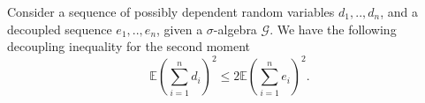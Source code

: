 \documentclass[ECP]{ejpecp} %
\newcommand{\G}{\mathcal{G}}
\newcommand{\lpar}{\left(}
\newcommand{\rpar}{\right)}
\newcommand{\E}{\mathbb{E}}
\newcommand{\sumn}{\sum\limits_{i=1}^n}
\begin{document}
\begin{theorem}
    \label{thm: decoupling inequality for 2nd moment}

    Consider a sequence of possibly dependent random variables $d_1,..,d_n$, and a decoupled sequence $e_1,..,e_n$, given a $\sigma$-algebra $\G$. We have the following decoupling inequality for the second moment
        \begin{equation}
            \label{equ: Decoupling Inequality for the Second Moment}
            \E \lpar \sumn d_i\rpar^2 \leq 2 \E \lpar \sumn e_i\rpar^2.
        \end{equation}
\end{theorem}
\end{document}
